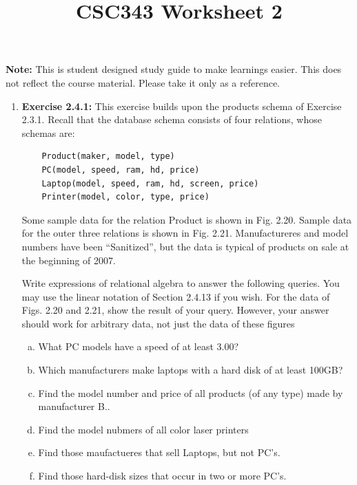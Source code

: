 \documentclass[12pt]{article}
\begin{document}
\title{CSC343 Worksheet 2}
\maketitle

\noindent \textbf{Note:} This is student designed study guide to make learnings easier.
This does not reflect the course material. Please take it only as a reference.

\begin{enumerate}[1.]
    \item \textbf{Exercise 2.4.1:} This exercise builds upon the products schema of
    Exercise 2.3.1. Recall that the database schema consists of four relations, whose
    schemas are:

    \begin{lstlisting}
    Product(maker, model, type)
    PC(model, speed, ram, hd, price)
    Laptop(model, speed, ram, hd, screen, price)
    Printer(model, color, type, price)
    \end{lstlisting}

    \bigskip

    Some sample data for the relation Product is shown in Fig. 2.20. Sample data
    for the outer three relations is shown in Fig. 2.21. Manufactureres and model
    numbers have been ``Sanitized'', but the data is typical of products on sale
    at the beginning of 2007.

    \bigskip

    Write expressions of relational algebra to answer the following queries. You
    may use the linear notation of Section 2.4.13 if you wish. For the data of Figs. 2.20
    and 2.21, show the result of your query. However, your answer should work for
    arbitrary data, not just the data of these figures

    \bigskip

    \begin{enumerate}[a)]
        \item What PC models have a speed of at least 3.00?
        \item Which manufacturers make laptops with a hard disk of at least 100GB?
        \item Find the model number and price of all products (of any type) made by manufacturer B..
        \item Find the model nubmers of all color laser printers
        \item Find those maufactueres that sell Laptops, but not PC's.
        \item Find those hard-disk sizes that occur in two or more PC's.
    \end{enumerate}


\end{enumerate}
\end{document}
